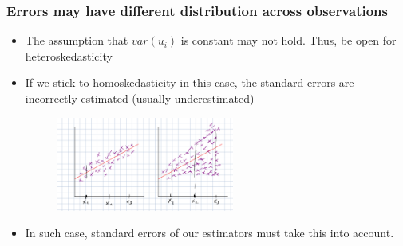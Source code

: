 \documentclass[aspectratio=169]{beamer}
\begin{document}
\begin{frame}
\frametitle{Errors may have different distribution across observations}
\begin{itemize}
\item The assumption that $var(u_i)$ is constant may not hold. Thus, be open for heteroskedasticity
\item If we stick to homoskedasticity in this case, the standard errors are incorrectly estimated (usually underestimated)
\begin{figure}[H]
\centering
\includegraphics[width=0.55\textwidth]{hetero.png}
\end{figure}
\item  In such case, standard errors of our estimators must take this into account.
\end{itemize}
\end{frame}
\end{document}

